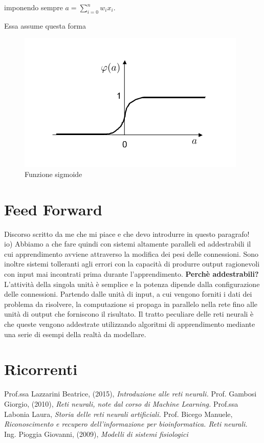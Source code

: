 \documentclass[12pt,a4paper,oneside]{book}
\begin{document}
		imponendo sempre $a=\sum\limits_{i=0}^n w_{i}x_{i}$.
		
		\clearpage
		Essa assume questa forma
		\begin{figure}[h]
			\centering
			\includegraphics[width=0.6\linewidth]{IMMAGINI/sigmoide}
			\caption{ Funzione sigmoide }
			\label{fig:sigmoide}
		\end{figure}
	
	
	
	
	
	
	
	\chapter{Feed Forward}
	Discorso scritto da me che mi piace e che devo introdurre in questo paragrafo!\\
	io) Abbiamo a che fare quindi con sistemi altamente paralleli ed addestrabili il cui apprendimento avviene attraverso la modifica dei pesi delle connessioni. Sono inoltre sistemi tolleranti agli errori con la capacità di produrre output ragionevoli con input mai incontrati prima durante l'apprendimento. \textbf{Perchè addestrabili?} L'attività della singola unità è semplice e la potenza dipende dalla configurazione delle connessioni.
	Partendo dalle unità di input, a cui vengono forniti i dati dei problema da risolvere, la computazione si propaga in parallelo nella rete fino alle unità di output che forniscono il risultato.
	Il tratto peculiare delle reti neurali è che queste vengono addestrate utilizzando algoritmi di apprendimento mediante una serie di esempi della realtà da modellare.
	
	\chapter{Ricorrenti}

\clearpage 
\begin{thebibliography}{9} 
	 Prof.ssa Lazzarini Beatrice, (2015), \emph{Introduzione alle reti neurali.}
	 Prof. Gambosi Giorgio, (2010), \emph{Reti neurali, note dal corso di Machine Learning.}
	 Prof.ssa Labonia Laura, \emph{Storia delle reti neurali artificiali.}
	 Prof. Bicego Manuele, \emph{Riconoscimento e recupero dell’informazione per bioinformatica. Reti neurali.}
	 Ing. Pioggia Giovanni, (2009), \emph{Modelli di sistemi fisiologici}
 \end{thebibliography}
	
\end{document}
